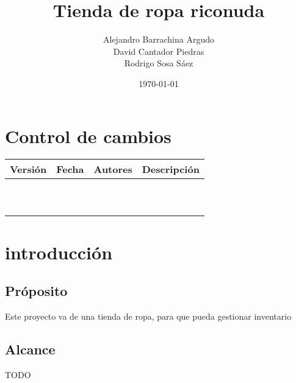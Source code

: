 \documentclass{article}
\title{Tienda de ropa riconuda}
\author{Alejandro Barrachina Argudo \\
David Cantador Piedras \\
Rodrigo Sosa Sáez }
\date{\today}
\begin{document}
\maketitle
\section*{Control de cambios} %
\noindent\begin{tabularx}{\textwidth}{ |l|l|p{5cm}|X| }
    \hline
    \textbf{Versión} & \textbf{Fecha} & \textbf{Autores} & \textbf{Descripción} \\
    \hline
                     &                &                  &                      \\
    \hline
                     &                &                  &                      \\
    \hline
                     &                &                  &                      \\
    \hline
                     &                &                  &                      \\
    \hline
                     &                &                  &                      \\
    \hline
                     &                &                  &                      \\
    \hline
                     &                &                  &                      \\
    \hline
                     &                &                  &                      \\
    \hline
                     &                &                  &                      \\
    \hline
                     &                &                  &                      \\
    \hline
\end{tabularx}


\section{introducción}
\subsection{Próposito}
Este proyecto va de una tienda de ropa, para que pueda gestionar inventario
\subsection{Alcance}
TODO
\end{document}
